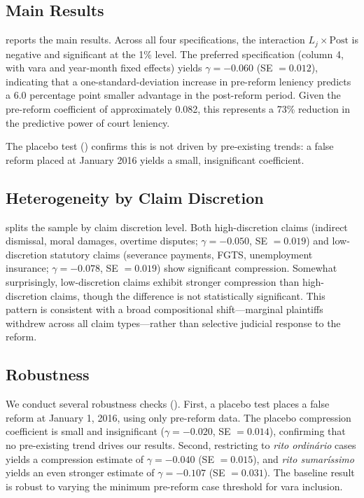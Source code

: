 \documentclass[12pt]{article}
\begin{document}


\subsection{Main Results}



 reports the main results. Across all four specifications, the interaction $L_j \times \text{Post}$ is negative and significant at the 1\% level. The preferred specification (column 4, with vara and year-month fixed effects) yields $\gamma = -0.060$ (SE $= 0.012$), indicating that a one-standard-deviation increase in pre-reform leniency predicts a 6.0 percentage point smaller advantage in the post-reform period. Given the pre-reform coefficient of approximately 0.082, this represents a 73\% reduction in the predictive power of court leniency.

The placebo test () confirms this is not driven by pre-existing trends: a false reform placed at January 2016 yields a small, insignificant coefficient.

\subsection{Heterogeneity by Claim Discretion}



 splits the sample by claim discretion level. Both high-discretion claims (indirect dismissal, moral damages, overtime disputes; $\gamma = -0.050$, SE $= 0.019$) and low-discretion statutory claims (severance payments, FGTS, unemployment insurance; $\gamma = -0.078$, SE $= 0.019$) show significant compression. Somewhat surprisingly, low-discretion claims exhibit stronger compression than high-discretion claims, though the difference is not statistically significant. This pattern is consistent with a broad compositional shift---marginal plaintiffs withdrew across all claim types---rather than selective judicial response to the reform.

\subsection{Robustness}



We conduct several robustness checks (). First, a placebo test places a false reform at January 1, 2016, using only pre-reform data. The placebo compression coefficient is small and insignificant ($\gamma = -0.020$, SE $= 0.014$), confirming that no pre-existing trend drives our results. Second, restricting to \textit{rito ordin\'{a}rio} cases yields a compression estimate of $\gamma = -0.040$ (SE $= 0.015$), and \textit{rito sumar\'{i}ssimo} yields an even stronger estimate of $\gamma = -0.107$ (SE $= 0.031$). The baseline result is robust to varying the minimum pre-reform case threshold for vara inclusion.
\end{document}
